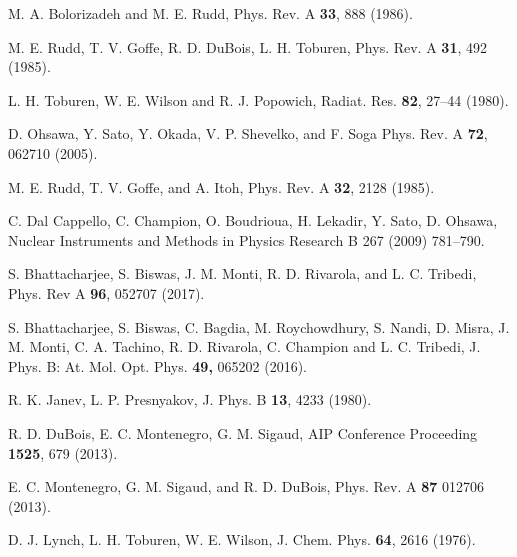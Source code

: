 \begin{thebibliography}{9}
M. A. Bolorizadeh and M. E. Rudd, 
Phys. Rev. A \textbf{33}, 888 (1986). 

M. E. Rudd, T. V. Goffe, R. D. DuBois, L. H. Toburen, 
Phys. Rev. A \textbf{31}, 492 (1985). 

L. H. Toburen, W. E. Wilson and R. J. Popowich,
Radiat. Res. \textbf{82}, 27--44 (1980).

D. Ohsawa, Y. Sato, Y. Okada, V. P. Shevelko, and F. Soga
Phys. Rev. A \textbf{72}, 062710 (2005).

M. E. Rudd, T. V. Goffe, and A. Itoh, 
Phys. Rev. A \textbf{32}, 2128 (1985).


C. Dal Cappello, C. Champion, O. Boudrioua, H. Lekadir, Y. Sato, 
D. Ohsawa, 
Nuclear Instruments and Methods in Physics Research B 267 (2009) 781--790.

S. Bhattacharjee, S. Biswas, J. M. Monti, R. D. Rivarola, and 
L. C. Tribedi,
Phys. Rev A \textbf{96}, 052707 (2017).

S. Bhattacharjee, S. Biswas, C. Bagdia, M. Roychowdhury, S. Nandi, 
D. Misra, J. M. Monti, C. A. Tachino, R. D. Rivarola, C. Champion and 
L. C. Tribedi, J. 
Phys. B: At. Mol. Opt. Phys. \textbf{49,}  065202 (2016).

R. K. Janev, L. P. Presnyakov, 
J. Phys. B \textbf{13}, 4233 (1980).

R. D. DuBois, E. C. Montenegro, G. M. Sigaud,
AIP Conference Proceeding \textbf{1525}, 679 (2013).

E. C. Montenegro, G. M. Sigaud, and R. D. DuBois, 
Phys. Rev. A \textbf{87} 012706 (2013).

D. J. Lynch, L. H. Toburen, W. E. Wilson,
J. Chem. Phys. \textbf{64}, 2616 (1976).


\end{thebibliography}
